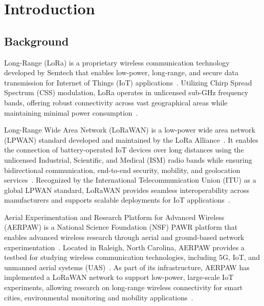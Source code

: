 \documentclass[journal]{IEEEtran}
\begin{document}


\vspace{-0.3cm}

\section{Introduction}\label{sec:intro}
\subsection{Background}

Long-Range (LoRa) is a proprietary wireless communication technology developed by Semtech that enables low-power, long-range, and secure data transmission for Internet of Things (IoT) applications~\cite{SemtechCorporation2024WhatLoRa}. Utilizing Chirp Spread Spectrum (CSS) modulation, LoRa operates in unlicensed sub-GHz frequency bands, offering robust connectivity across vast geographical areas while maintaining minimal power consumption~\cite{SemtechCorporation2024WhatLoRa }.

Long-Range Wide Area Network (LoRaWAN) is a low-power wide area network (LPWAN) standard developed and maintained by the LoRa Alliance~\cite{SemtechCorporation2024WhatLoRaWAN}. It enables the connection of battery-operated IoT devices over long distances using the unlicensed Industrial, Scientific, and Medical (ISM) radio bands while ensuring bidirectional communication, end-to-end security, mobility, and geolocation services~\cite{SemtechCorporation2024WhatLoRaWAN}. Recognized by the International Telecommunication Union (ITU) as a global LPWAN standard, LoRaWAN provides seamless interoperability across manufacturers and supports scalable deployments for IoT applications~\cite{SemtechCorporation2024WhatLoRaWAN}.

Aerial Experimentation and Research Platform for Advanced Wireless (AERPAW) is a National Science Foundation (NSF) PAWR platform that enables advanced wireless research through aerial and ground-based network experimentation~\cite{AERPAW2024AERPAW}. Located in Raleigh, North Carolina, AERPAW provides a testbed for studying wireless communication technologies, including 5G, IoT, and unmanned aerial systems (UAS)~\cite{AERPAW2024AERPAW}. As part of its infrastructure, AERPAW has implemented a LoRaWAN network to support low-power, large-scale IoT experiments, allowing research on long-range wireless connectivity for smart cities, environmental monitoring and mobility applications~\cite{AERPAW2024AERPAW}.
\end{document}
